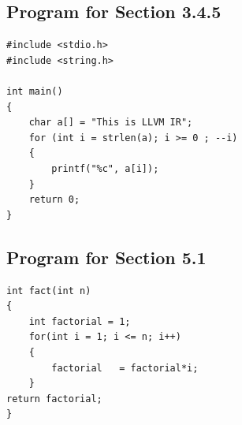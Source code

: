 \documentclass{article}
\begin{document}
\subsection{Program for Section 3.4.5}
\begin{flushleft}
\label{p5}
\begin{lstlisting}
#include <stdio.h>
#include <string.h>

int main()
{
	char a[] = "This is LLVM IR";
	for (int i = strlen(a); i >= 0 ; --i)
	{
		printf("%c", a[i]);
	}
	return 0;
}
\end{lstlisting}
\end{flushleft}
\newpage

\subsection{Program for Section 5.1}
\begin{flushleft}
\label{p6}
\begin{lstlisting}
int fact(int n)
{
	int factorial = 1;
	for(int i = 1; i <= n; i++)
	{
		factorial	= factorial*i;
	}
return factorial;
}
\end{lstlisting}
\end{flushleft}
\end{document}
